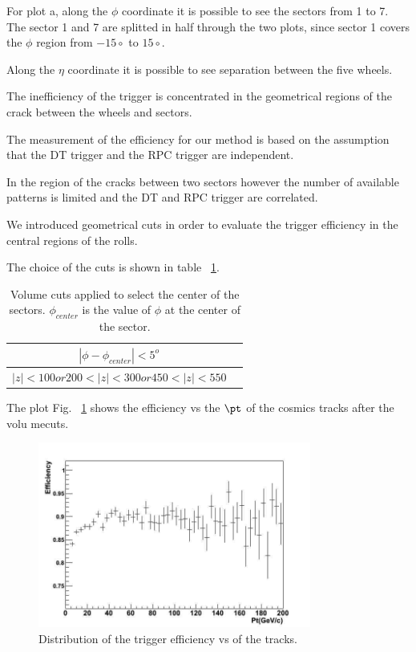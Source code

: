 For plot a, along the $\phi$ coordinate it is possible to see the sectors from 1 to 7.
The sector 1 and 7 are splitted in half through the two plots, since sector 1 covers the $\phi$
region from $-15\circ$ to $15\circ$. 

Along the $\eta$ coordinate it is possible to see separation between the five wheels. 

The inefficiency of the trigger is concentrated in the geometrical regions of the crack 
between the wheels and sectors.


The measurement of the efficiency for our method is based on the assumption that 
the DT trigger and the RPC trigger are independent.

In the region of the cracks between two sectors however the number of 
available patterns is limited and the DT and RPC trigger are correlated.

We introduced geometrical cuts in order to evaluate the trigger efficiency 
in the central regions of the rolls. 

The choice of the cuts is shown in table ~\ref{tab:volumecuts}. 

 \begin{table}[htb]
    \begin{center}
      \begin{tabular}{|c|c|} \hline
  $   |\phi - \phi_{center} | < 5^o $ & \\ \hline
  $  |z| < 100 or 200 < |z| < 300 or 450 < |z| < 550$  &  \\ \hline
      \end{tabular}
      \caption{Volume cuts applied to select the center of the sectors.
       $\phi_{center}$ is the value of $\phi$ at the center of the sector. 
}
    \label{tab:volumecuts}
    \end{center}
  \end{table}


The plot Fig. ~\ref{fig:eff_pt_08} shows the efficiency vs the $\pt$ of the cosmics tracks after 
the volu mecuts.

\begin{figure}[hbtp]
  \begin{center}
    \includegraphics[width=0.8\textwidth]{eff_pt_08}
    \hspace{1cm}
    \caption{Distribution of the trigger efficiency vs \pt of the tracks.}
    \label{fig:eff_pt_08}
  \end{center}
\end{figure}



